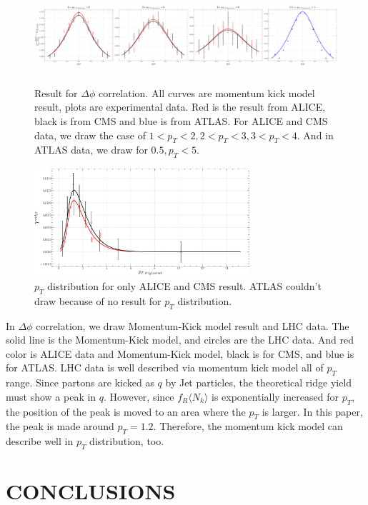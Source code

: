 \documentclass[jkps,fleqn,showpacs,showkeys]{revtex4-2}
\begin{document}
\begin{figure}[ht]
\centering
\includegraphics[width=16cm, height=3.5cm]{Paper_phiCorr}
\caption{Result for $\Delta \phi$ correlation. All curves are momentum kick model result, plots are experimental data.
Red is the result from ALICE, black is from CMS and blue is from ATLAS.
For ALICE and CMS data, we draw the case of $1<p_T<2, 2<p_T<3, 3<p_T<4$. And in ATLAS data, we draw for $0.5,p_T<5$.}
\label{figure:phicorr}
\end{figure}

\begin{figure}[ht]
\centering
\includegraphics[width=8cm, height=4cm]{Paper_pTdis}
\caption{$p_T$ distribution for only ALICE and CMS result. ATLAS couldn’t draw because of no result for $p_T$ distribution.}
\label{figure:pTdis}
\end{figure}

In $\Delta\phi$ correlation, we draw Momentum-Kick model result and LHC data. 
The solid line is the Momentum-Kick model, and circles are the LHC data. And red color is ALICE data and Momentum-Kick model, 
black is for CMS, and blue is for ATLAS. LHC data is well described via momentum kick model all of $p_T$ range.
Since partons are kicked as $q$ by Jet particles, the theoretical ridge yield must show a peak in $q$. 
However, since $f_R \langle N_k \rangle $ is exponentially increased for $p_T$, the position of the peak is moved to an area where the $p_T$ is larger. 
In this paper, the peak is made around $p_T=1.2$. Therefore, the momentum kick model can describe well in $p_T$ distribution, too.






\section*{CONCLUSIONS}
\label{sec:Conclusion}
\end{document}
